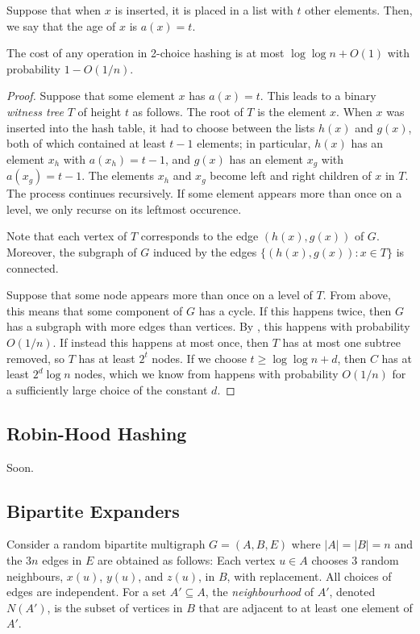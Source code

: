 \documentclass{patmorin}
\begin{document}
Suppose that when $x$ is inserted, it is placed in a list with $t$
other elements. Then, we say that the age of $x$ is $a(x) = t$.
\begin{thm}
  The cost of any operation in 2-choice hashing is at most
  $\log \log n + O(1)$ with probability $1 - O(1/n)$.
\end{thm}
\begin{proof}
  Suppose that some element $x$ has $a(x) = t$. This leads to a binary
  \emph{witness tree} $T$ of height $t$ as follows.
  The root of $T$ is the element $x$. When $x$ was inserted into the
  hash table, it had to choose between the lists $h(x)$ and $g(x)$,
  both of which contained at least $t - 1$ elements; in particular,
  $h(x)$ has an element $x_h$ with $a(x_h) = t - 1$, and $g(x)$ has an
  element $x_g$ with $a(x_g) = t - 1$. The elements $x_h$ and $x_g$
  become left and right children of $x$ in $T$. The process continues
  recursively. If some element appears more than once on a level, we
  only recurse on its leftmost occurence.

  Note that each vertex of $T$ corresponds to the edge $(h(x), g(x))$
  of $G$. Moreover, the subgraph of $G$ induced by the edges
  $\{(h(x), g(x)) : x \in T\}$ is connected.

  Suppose that some node appears more than once on a level of
  $T$. From above, this means that some component of $G$ has a
  cycle. If this happens twice, then $G$ has a subgraph with more
  edges than vertices. By , this happens
  with probability $O(1/n)$. If instead this happens at most once,
  then $T$ has at most one subtree removed, so $T$ has at least $2^t$
  nodes. If we choose $t \ge \log \log n + d$, then $C$ has at least
  $2^d \log n$ nodes, which we know from
   happens with probability $O(1/n)$
  for a sufficiently large choice of the constant $d$.
\end{proof}

\subsection{Robin-Hood Hashing}

Soon.


\subsection{Bipartite Expanders}

Consider a random bipartite multigraph $G=(A,B,E)$ where $|A|=|B|=n$
and the $3n$ edges in $E$ are obtained as follows:  Each vertex $u\in A$
chooses 3 random neighbours, $x(u)$, $y(u)$, and $z(u)$, in $B$, with
replacement.  All choices of edges are independent. For a set $A'\subseteq
A$, the \emph{neighbourhood} of $A'$, denoted $N(A')$, is the subset of
vertices in $B$ that are adjacent to at least one element of $A'$.
\end{document}
